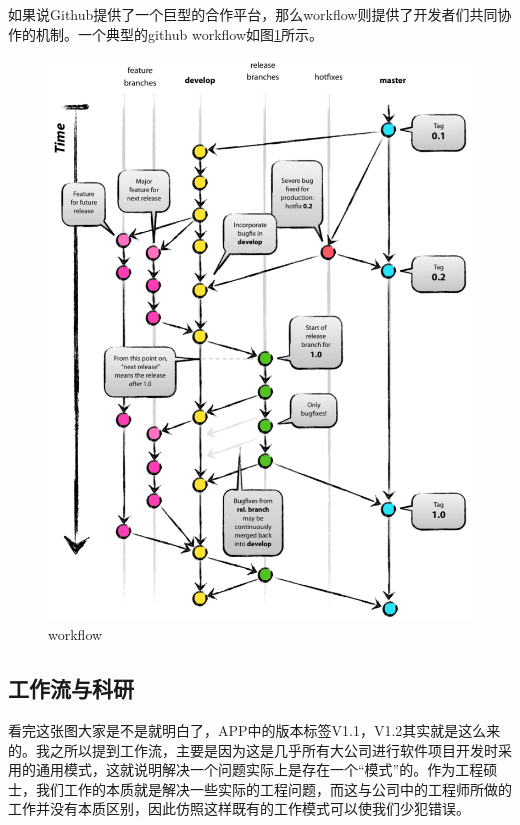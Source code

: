 \documentclass[UTF8,oneside]{ctexbook}
\begin{document}
如果说Github提供了一个巨型的合作平台，那么workflow则提供了开发者们共同协作的机制。一个典型的github workflow如图\ref{fig:workflow}所示。

\begin{figure}[!htb]
	\centering
	\includegraphics[width=1\linewidth]{Figure/workflow.pdf}
	\vspace{-0.3cm}
	\caption{workflow}\label{fig:workflow}
\end{figure}

\subsection{工作流与科研}
看完这张图大家是不是就明白了，APP中的版本标签V1.1，V1.2其实就是这么来的。我之所以提到工作流，主要是因为这是几乎所有大公司进行软件项目开发时采用的通用模式，这就说明解决一个问题实际上是存在一个“模式”的。作为工程硕士，我们工作的本质就是解决一些实际的工程问题，而这与公司中的工程师所做的工作并没有本质区别，因此仿照这样既有的工作模式可以使我们少犯错误。
\end{document}
